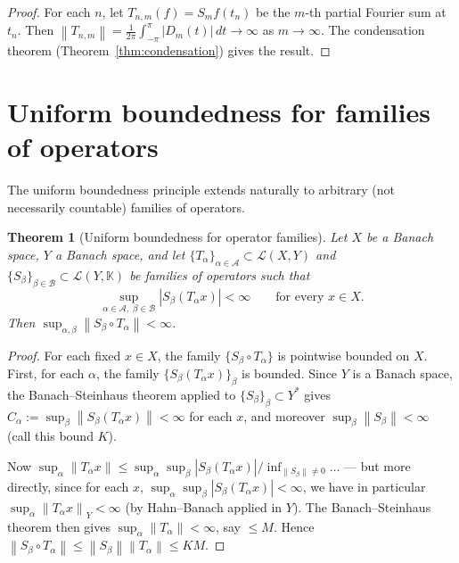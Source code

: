 \documentclass[a4paper,12pt]{book}
\newcommand{\K}{\mathbb{K}}
\newcommand{\norm}[1]{\left\| #1 \right\|}
\newcommand{\abs}[1]{\left| #1 \right|}
\theoremstyle{definition}
\theoremstyle{plain}
\newtheorem{theorem}[definition]{Theorem}
\theoremstyle{remark}
\begin{document}
\begin{proof}
For each $n$, let $T_{n,m}(f) = S_m f(t_n)$ be the $m$-th partial Fourier sum at
$t_n$. Then $\norm{T_{n,m}} = \frac{1}{2\pi}\int_{-\pi}^{\pi}\abs{D_m(t)}\,dt
\to \infty$ as $m \to \infty$. The condensation theorem
(Theorem~\ref{thm:condensation}) gives the result.
\end{proof}

\section{Uniform boundedness for families of operators}%
\label{sec:ubp-families}

The uniform boundedness principle extends naturally to arbitrary (not necessarily
countable) families of operators.

\begin{theorem}[Uniform boundedness for operator families]%
\label{thm:ubp-families}
Let $X$ be a Banach space, $Y$ a Banach space, and let
$\{T_\alpha\}_{\alpha \in \mathcal{A}} \subset \mathcal{L}(X,Y)$ and
$\{S_\beta\}_{\beta \in \mathcal{B}} \subset \mathcal{L}(Y,\K)$ be families of
operators such that
\[
  \sup_{\alpha \in \mathcal{A},\; \beta \in \mathcal{B}}
  \abs{S_\beta(T_\alpha x)} < \infty
  \qquad \text{for every } x \in X.
\]
Then $\sup_{\alpha,\beta} \norm{S_\beta \circ T_\alpha} < \infty$.
\end{theorem}

\begin{proof}
For each fixed $x \in X$, the family $\{S_\beta \circ T_\alpha\}$ is pointwise
bounded on $X$. First, for each $\alpha$, the family $\{S_\beta(T_\alpha x)\}_\beta$
is bounded. Since $Y$ is a Banach space, the Banach--Steinhaus theorem
applied to $\{S_\beta\}_\beta \subset Y^*$ gives
$C_\alpha := \sup_\beta \norm{S_\beta(T_\alpha x)} < \infty$ for each $x$, and
moreover $\sup_\beta \norm{S_\beta} < \infty$ (call this bound $K$).

Now $\sup_\alpha \norm{T_\alpha x} \leq \sup_\alpha \sup_\beta
\abs{S_\beta(T_\alpha x)} / \inf_{\norm{S_\beta}\neq 0} \ldots$ --- but more
directly, since for each $x$, $\sup_\alpha \sup_\beta \abs{S_\beta(T_\alpha x)}
< \infty$, we have in particular $\sup_\alpha \norm{T_\alpha x}_Y < \infty$ (by
Hahn--Banach applied in $Y$). The Banach--Steinhaus theorem then gives
$\sup_\alpha \norm{T_\alpha} < \infty$, say $\leq M$. Hence
$\norm{S_\beta \circ T_\alpha} \leq \norm{S_\beta}\norm{T_\alpha} \leq KM$.
\end{proof}
\end{document}

